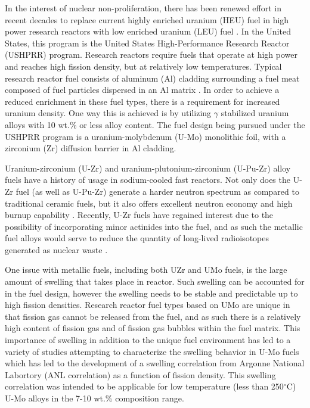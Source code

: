 \documentclass[review]{elsarticle}
\begin{document}
In the interest of nuclear non-proliferation, there has been renewed effort in recent decades to replace current highly enriched uranium (HEU) fuel in high power research reactors with low enriched uranium (LEU) fuel \cite{snelgrove1997}. In the United States, this program is the United States High-Performance Research Reactor (USHPRR) program. Research reactors require fuels that operate at high power and reaches high fission density, but at relatively low temperatures. Typical research reactor fuel consists of aluminum (Al) cladding surrounding a fuel meat composed of fuel particles dispersed in an Al matrix \cite{meyer2014}. In order to achieve a reduced enrichment in these fuel types, there is a requirement for increased uranium density. One way this is achieved is by utilizing $\gamma$ stabilized uranium alloys with 10 wt.\% or less alloy content. The fuel design being pursued under the USHPRR program is a uranium-molybdenum (U-Mo) monolithic foil, with a zirconium (Zr) diffusion barrier in Al cladding. 

Uranium-zirconium (U-Zr) and uranium-plutonium-zirconium (U-Pu-Zr) alloy fuels have a history of usage in sodium-cooled fast reactors. Not only does the U-Zr fuel (as well as U-Pu-Zr) generate a harder neutron spectrum as compared to traditional ceramic fuels, but it also offers excellent neutron economy and high burnup capability \cite{hofman1997}. Recently, U-Zr fuels have regained interest due to the possibility of incorporating minor actinides into the fuel, and as such the metallic fuel alloys would serve to reduce the quantity of long-lived radioisotopes generated as nuclear waste \cite{capriotti2017}. 

One issue with metallic fuels, including both UZr and UMo fuels, is the large amount of swelling that takes place in reactor\cite{hofman1997}. Such swelling can be accounted for in the fuel design, however the swelling needs to be stable and predictable up to high fission densities. Research reactor fuel types based on UMo are unique in that fission gas cannot be released from the fuel, and as such there is a relatively high content of fission gas and of fission gas bubbles within the fuel matrix. This importance of swelling in addition to the unique fuel environment has led to a variety of studies attempting to characterize the swelling behavior in U-Mo fuels \cite{rest2009, kim_anl08, meyer2002, kim2013} which has led to the development of a swelling correlation from Argonne National Labortory (ANL correlation) \cite{kim2011} as a function of fission density. This swelling correlation was intended to be applicable for low temperature (less than 250$^{\circ}$C) U-Mo alloys in the 7-10 wt.\% composition range. 
\end{document}
